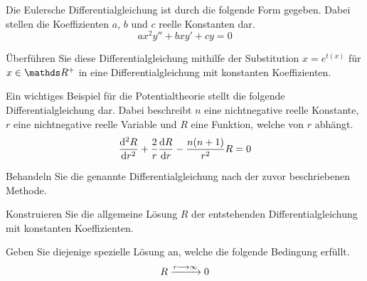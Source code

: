 \begin{atiTask}[
	title = Die homogene Euler-Gleichung
]
	Die Eulersche Differentialgleichung ist durch die folgende Form gegeben.
	Dabei stellen die Koeffizienten $a$, $b$ und $c$ reelle Konstanten dar.
	\[
		ax^2y'' + bxy' + cy = 0
	\]
	\begin{atiSubtasks}
		\item{
			Überführen Sie diese Differentialgleichung mithilfe der Substitution $x = e^{t(x)}$ für $x\in\setReal^+$ in eine Differentialgleichung mit konstanten Koeffizienten.
		}
		\item{
			Ein wichtiges Beispiel für die Potentialtheorie stellt die folgende Differentialgleichung dar.
			Dabei beschreibt $n$ eine nichtnegative reelle Konstante, $r$ eine nichtnegative reelle Variable und $R$ eine Funktion, welche von $r$ abhängt.
			\[
				\leibnizDerivative[2]{R}{r} + \frac{2}{r}\leibnizDerivative{R}{r} - \frac{n(n+1)}{r^2}R = 0
			\]
			\begin{atiSubsubtasks}
				\item{
					Behandeln Sie die genannte Differentialgleichung nach der zuvor beschriebenen Methode.
				}
				\item{
					Konstruieren Sie die allgemeine Lösung $R$ der entstehenden Differentialgleichung mit konstanten Koeffizienten.
				}
				\item{
					Geben Sie diejenige spezielle Lösung an, welche die folgende Bedingung erfüllt.
					\[
						R\converges[r\converges\infty]0
					\]
				}
			\end{atiSubsubtasks}
		}
	\end{atiSubtasks}
\end{atiTask}